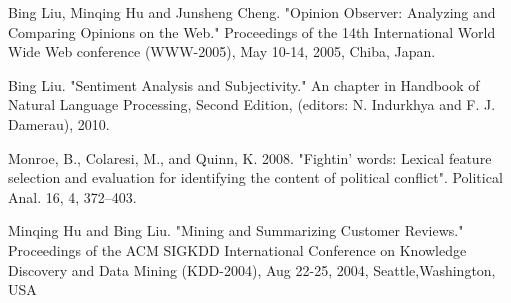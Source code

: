 
Bing Liu, Minqing Hu and Junsheng Cheng. "Opinion Observer: Analyzing  and Comparing Opinions on the Web." Proceedings of the 14th International World Wide Web conference (WWW-2005), May 10-14,  2005, Chiba, Japan.

Bing Liu. "Sentiment Analysis and Subjectivity." An chapter in  Handbook of Natural Language Processing, Second Edition, (editors: N. Indurkhya and F. J. Damerau), 2010.

Monroe, B., Colaresi, M., and Quinn, K. 2008. "Fightin' words: Lexical feature selection and evaluation for identifying the content of political conflict". Political Anal. 16, 4, 372--403.

Minqing Hu and Bing Liu. "Mining and Summarizing Customer Reviews." Proceedings of the ACM SIGKDD International Conference on Knowledge  Discovery and Data Mining (KDD-2004), Aug 22-25, 2004, Seattle,Washington, USA



